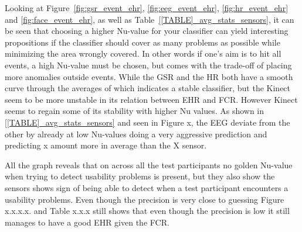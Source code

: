 Looking at Figure~\ref{fig:gsr_event_ehr}, \ref{fig:eeg_event_ehr}, \ref{fig:hr_event_ehr} and \ref{fig:face_event_ehr},
as well as Table~\ref{[TABLE]_avg_stats_sensors}, it can be seen that choosing a higher Nu-value for your classifier can yield interesting propositions if the classifier should cover as many problems as possible while minimizing the area wrongly covered.
In other words if one's aim is to hit all events, a high Nu-value must be chosen, but comes with the trade-off of placing more anomalies outside events. 
While the GSR and the HR both have a smooth curve through the averages of which indicates a stable classifier, but the Kinect seem to be more unstable in its relation between EHR and FCR. However Kinect seems to regain some of its stability with higher Nu values. As shown in \ref{[TABLE]_avg_stats_sensors} and seen in Figure x, the EEG deviate from the other by already at low Nu-values doing a very aggressive prediction and predicting x amount more in average than the X sensor.

All the graph reveals that on across all the test participants no golden Nu-value when trying to detect usability problems is present, but they also show the sensors shows sign of being able to detect when a test participant encounters a usability problems. Even though the precision is very close to guessing  
Figure x.x.x.x. and Table x.x.x still shows that even though the precision is low it still manages to have a good EHR given the FCR.
